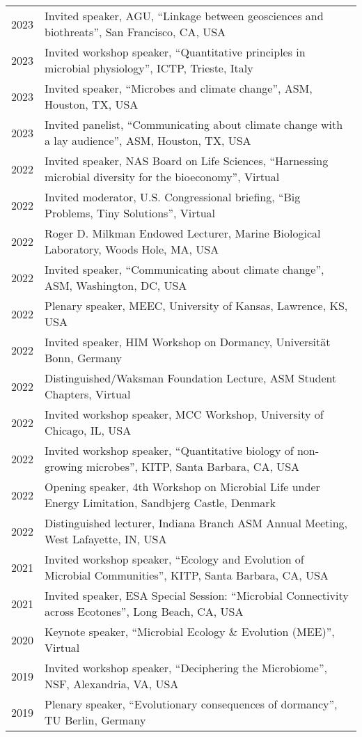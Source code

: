 \documentclass[11pt]{article}
\begin{document}
\begin{longtable}{@{}p{3em}@{\hspace{1.5em}}p{}@{}}
2023 & Invited speaker, AGU, “Linkage between geosciences and biothreats”, San Francisco, CA, USA \\
2023 & Invited workshop speaker, “Quantitative principles in microbial physiology”, ICTP, Trieste, Italy \\
2023 & Invited speaker, “Microbes and climate change”, ASM, Houston, TX, USA \\
2023 & Invited panelist, “Communicating about climate change with a lay audience”, ASM, Houston, TX, USA \\
2022 & Invited speaker, NAS Board on Life Sciences, “Harnessing microbial diversity for the bioeconomy”, Virtual \\
2022 & Invited moderator, U.S. Congressional briefing, “Big Problems, Tiny Solutions”, Virtual \\
2022 & Roger D. Milkman Endowed Lecturer, Marine Biological Laboratory, Woods Hole, MA, USA \\
2022 & Invited speaker, “Communicating about climate change”, ASM, Washington, DC, USA \\
2022 & Plenary speaker, MEEC, University of Kansas, Lawrence, KS, USA \\
2022 & Invited speaker, HIM Workshop on Dormancy, Universität Bonn, Germany \\
2022 & Distinguished/Waksman Foundation Lecture, ASM Student Chapters, Virtual \\
2022 & Invited workshop speaker, MCC Workshop, University of Chicago, IL, USA \\
2022 & Invited workshop speaker, “Quantitative biology of non-growing microbes”, KITP, Santa Barbara, CA, USA \\
2022 & Opening speaker, 4th Workshop on Microbial Life under Energy Limitation, Sandbjerg Castle, Denmark \\
2022 & Distinguished lecturer, Indiana Branch ASM Annual Meeting, West Lafayette, IN, USA \\
2021 & Invited workshop speaker, “Ecology and Evolution of Microbial Communities”, KITP, Santa Barbara, CA, USA \\
2021 & Invited speaker, ESA Special Session: “Microbial Connectivity across Ecotones”, Long Beach, CA, USA \\
2020 & Keynote speaker, “Microbial Ecology \& Evolution (MEE)”, Virtual \\
2019 & Invited workshop speaker, “Deciphering the Microbiome”, NSF, Alexandria, VA, USA \\
2019 & Plenary speaker, “Evolutionary consequences of dormancy”, TU Berlin, Germany \\

\end{longtable}
\end{document}
